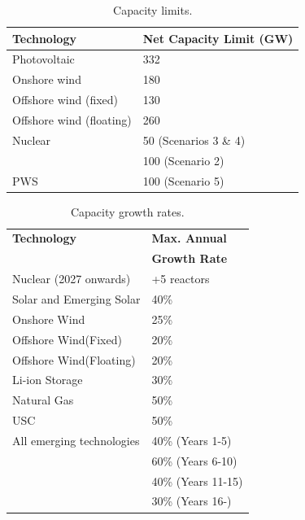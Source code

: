 


\begin{table}[H]
	\caption{Capacity limits.}
	\vspace{0.1in}
	\begin{tabularx}{\textwidth}{p{} p{} }
		\hline
\textbf{Technology} & \textbf{Net Capacity} \textbf{Limit} (GW)\\
\hline
Photovoltaic \cite{isep_53_2018} & 332 \\
Onshore wind \cite{heger_wind_2016,kato_energy_2016} & 180 \\
Offshore wind (fixed) \cite{heger_wind_2016,kato_energy_2016}& 130 \\
Offshore wind (floating) \cite{heger_wind_2016,kato_energy_2016}& 260 \\
Nuclear & 50 (Scenarios 3 \& 4) \\
 & 100 (Scenario 2) \\
\gls{PWS} \cite{pinaud_technical_2013} & 100 (Scenario 5) \\
\hline 
\end{tabularx}
\label{caplim}
\end{table}

\begin{table}[H]
	\caption{Capacity growth rates.}
	\vspace{0.1in}
	\begin{tabularx}{\textwidth}{p{} p{}}
		\hline
\textbf{Technology} & \textbf{Max. Annual} \\
  & \textbf{Growth Rate}   \\
\hline
Nuclear (2027 onwards) & +5 reactors \\
Solar and Emerging Solar \cite{irena_renewable_2020} & 40\%  \\
Onshore Wind \cite{irena_renewable_2020} & 25\% \\
Offshore Wind(Fixed) \cite{irena_renewable_2020} & 20\% \\
Offshore Wind(Floating) \cite{irena_renewable_2020} & 20\% \\
Li-ion Storage & 30\% \\
Natural Gas &  50\% \\
\gls{USC} & 50\% \\
All emerging technologies & 40\% (Years 1-5) \\
& 60\% (Years 6-10) \\
 & 40\% (Years 11-15) \\
 & 30\% (Years 16-) \\
\hline 
\end{tabularx}
\label{growrate}
\end{table}

